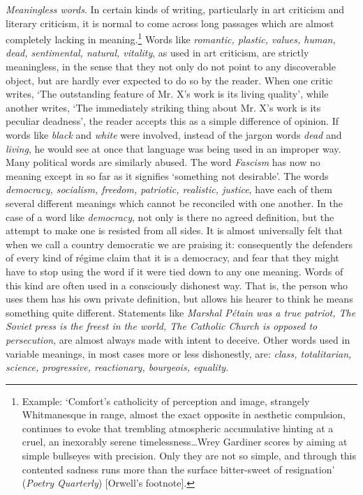 \vspace{1\baselineskip}

\textit{Meaningless words}. In certain kinds of writing, particularly
in art criticism and literary criticism, it is normal to come across
long passages which are almost completely lacking in
meaning.\footnote{Example: `Comfort's catholicity of perception and
image, strangely Whitmanesque in range, almost the exact opposite in
aesthetic compulsion, continues to evoke that trembling atmospheric
accumulative hinting at a cruel, an inexorably serene
timelessness\ldots Wrey Gardiner scores by aiming at simple bullseyes
with precision. Only they are not so simple, and through this
contented sadness runs more than the surface bitter-sweet of
resignation' (\textit{Poetry Quarterly}) [Orwell's footnote].} Words
like \textit{romantic, plastic, values, human, dead, sentimental,
natural, vitality}, as used in art criticism, are strictly
meaningless, in the sense that they not only do not point to any
discoverable object, but are hardly ever expected to do so by the
reader. When one critic writes, `The outstanding feature of Mr. X's
work is its living quality', while another writes, `The immediately
striking thing about Mr. X's work is its peculiar deadness', the
reader accepts this as a simple difference of opinion. If words like
\textit{black} and \textit{white} were involved, instead of the jargon
words \textit{dead} and \textit{living}, he would see at once that
language was being used in an improper way. Many political words are
similarly abused. The word \textit{Fascism} has now no meaning except
in so far as it signifies  `something not desirable'. The
words \textit{democracy, socialism, freedom, patriotic, realistic,
justice}, have each of them several different meanings which cannot be
reconciled with one another. In the case of a word like
\textit{democracy}, not only is there no agreed definition, but the
attempt to make one is resisted from all sides. It is almost
universally felt that when we call a country democratic we are
praising it: consequently the defenders of every kind of r\'{e}gime
claim that it is a democracy, and fear that they might have to stop
using the word if it were tied down to any one meaning. Words of this
kind are often used in a consciously dishonest way. That is, the
person who uses them has his own private definition, but allows his
hearer to think he means something quite different. Statements like
\textit{Marshal P\'{e}tain was a true patriot, The Soviet press is the
freest in the world, The Catholic Church is opposed to persecution},
are almost always made with intent to deceive. Other words used in
variable meanings, in most cases more or less dishonestly, are:
\textit{class, totalitarian, science, progressive, reactionary,
bourgeois, equality}.

